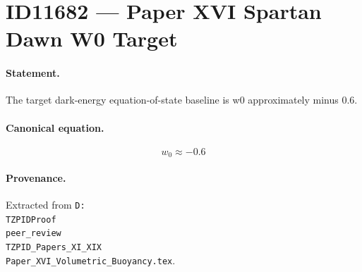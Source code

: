 \section*{ID11682 --- Paper XVI Spartan Dawn W0 Target}

\paragraph{Statement.}
The target dark-energy equation-of-state baseline is w0 approximately minus 0.6.

\paragraph{Canonical equation.}
\[
w_0\approx-0.6
\]

\paragraph{Provenance.}
Extracted from \texttt{D:\\TZPIDProof\\peer\_review\\TZPID\_Papers\_XI\_XIX\\Paper\_XVI\_Volumetric\_Buoyancy.tex}.
